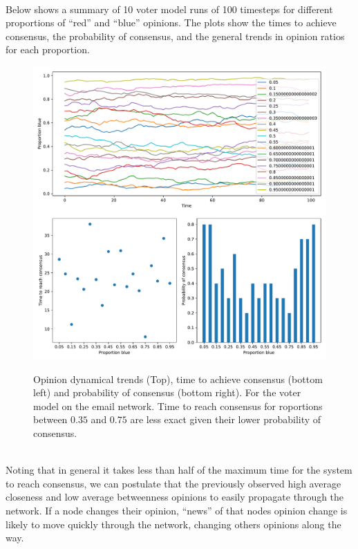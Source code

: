 \documentclass[11pt, oneside]{article}   	%
\newcommand{\prob}[2]{
\indent \\
\noindent{\color{green!50!blue}\bf {\large#1}}
{\normalfont #2}
}
\begin{document}
	\indent \prob{b)}{Below shows a summary of 10 voter model runs of 100 timesteps for different proportions of ``red'' and ``blue'' opinions. 
                      The plots show  the times to achieve consensus, the probability of consensus, and the general trends in opinion ratios for each proportion.
	\begin{figure}[h!]
		\centering
		\includegraphics[width=15cm]{figs/voter_model_plot.pdf}
		\label{changeI_kmaxnodes}\vspace{-4mm}
        \caption{Opinion dynamical trends (Top), time to achieve consensus (bottom left) and probability of consensus (bottom right). For the voter model 
        on the email network. Time to reach consensus for roportions between $0.35$ and $0.75$ are less exact given their lower probability of consensus.}
	\end{figure}}

	\indent \prob{c)}{Noting that in general it takes less than half of the maximum time for the system to reach consensus, we can postulate that the previously
                      observed high average closeness and low average betweenness opinions to easily propagate through the network. 
                      If a node changes their opinion, ``news'' of that nodes opinion change is likely to move quickly through the network, changing others
                      opinions along the way.}
\end{document}
